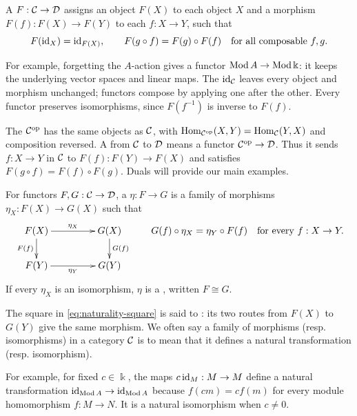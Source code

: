 \begin{definition}\label{def:functor}
A  $F:\mathcal{C}\to\mathcal{D}$ assigns an object $F(X)$ to each object $X$ and a morphism $F(f):F(X)\to F(Y)$ to each $f:X\to Y$, such that
\[
F(\operatorname{id}_X)=\operatorname{id}_{F(X)},\qquad F(g\circ f)=F(g)\circ F(f)
\quad\text{for all composable }f,g.
\]
\end{definition}

For example, forgetting the $A$-action gives a functor $\operatorname{\mathrm{Mod}} A\to\operatorname{\mathrm{Mod}}\Bbbk$: it keeps the underlying vector spaces and linear maps.
The  $\operatorname{id}_{\mathcal{C}}$ leaves every object and morphism unchanged; functors compose by applying one after the other.
Every functor preserves isomorphisms, since $F(f^{-1})$ is inverse to $F(f)$.

\label{not:opposite-category}
The  $\mathcal{C}^{\mathrm{op}}$ has the same objects as $\mathcal{C}$, with $\operatorname{Hom}\nolimits_{\mathcal{C}^{\mathrm{op}}}(X,Y)=\operatorname{Hom}\nolimits_{\mathcal{C}}(Y,X)$ and composition reversed.
A  from $\mathcal{C}$ to $\mathcal{D}$ means a functor $\mathcal{C}^{\mathrm{op}}\to\mathcal{D}$.
Thus it sends $f:X\to Y$ in $\mathcal{C}$ to $F(f):F(Y)\to F(X)$ and satisfies $F(g\circ f)=F(f)\circ F(g)$.
Duals will provide our main examples.

\begin{definition}\label{def:natural-transformation}
For functors $F,G:\mathcal{C}\to\mathcal{D}$, a  $\eta:F\to G$ is a family of morphisms $\eta_X:F(X)\to G(X)$ such that
\begin{equation}\label{eq:naturality-square}
\xymatrix@C=45pt@R=20pt{
F(X) \ar[r]^{\eta_X} \ar[d]_{F(f)} & G(X) \ar[d]^{G(f)}\\
F(Y) \ar[r]_{\eta_Y} & G(Y)
}
\qquad
G(f)\circ\eta_X=\eta_Y\circ F(f)
\quad\text{for every }f:X\to Y.
\end{equation}
If every $\eta_X$ is an isomorphism, $\eta$ is a , written $F\cong G$.
\end{definition}

The square in \eqref{eq:naturality-square} is said to : its two routes from $F(X)$ to $G(Y)$ give the same morphism.
We often say a family of morphisms (resp. isomorphisms) in a category $\mathcal{C}$ is  to mean that it defines a natural transformation (resp. isomorphism).

For example, for fixed $c\in\Bbbk$, the maps $c\operatorname{id}_M:M\to M$ define a natural transformation $\operatorname{id}_{\operatorname{\mathrm{Mod}} A}\to\operatorname{id}_{\operatorname{\mathrm{Mod}} A}$ because $f(cm)=cf(m)$ for every module homomorphism $f:M\to N$.
It is a natural isomorphism when $c\neq0$.


